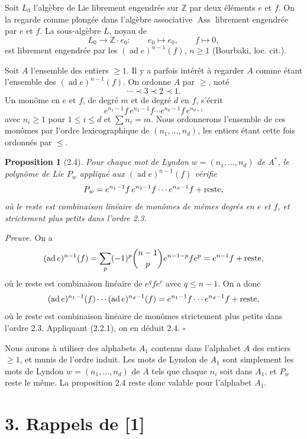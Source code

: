 \documentclass[10pt,a4paper]{article}
\newcommand{\Z}{\mathbb Z}
\newcommand{\Ass}{\operatorname{Ass}}
\newcommand{\ad}{\operatorname{ad}}
\theoremstyle{deligne}
\newtheorem*{proposition*}{Proposition}
\newenvironment{proofdel}{\textit{Preuve.}}{\hfill$\square$}
\newcommand{\heading}[1]{\vspace{0.65em}\noindent{\bfseries #1}\quad}
\begin{document}
\heading{2.3.} Soit \(L_0\) l'algèbre de Lie librement engendrée sur \(\Z\) par deux éléments \(e\) et \(f\). On la regarde comme plongée dans l'algèbre associative \(\Ass\) librement engendrée par \(e\) et \(f\). La sous-algèbre \(L\), noyau de
\[
\tag{2.3.1}
L_0\longrightarrow \Z\cdot e_0:\qquad e_0\longmapsto e_0,
\qquad f\longmapsto 0,
\]
est librement engendrée par les \((\ad e)^{n-1}(f)\), \(n\ge1\) (Bourbaki, loc. cit.).

Soit \(A\) l'ensemble des entiers \(\ge1\). Il y a parfois intérêt à regarder \(A\) comme étant l'ensemble des \((\ad e)^{n-1}(f)\). On ordonne \(A\) par \(\ge\), noté
\[
\cdots\prec 3\prec 2\prec 1.
\]
Un monôme en \(e\) et \(f\), de degré \(m\) et de degré \(d\) en \(f\), s'écrit
\[
e^{n_1-1}f\,e^{n_2-1}f\cdots e^{n_d-1}f\,e^{n_{d+1}}
\]
avec \(n_i\ge1\) pour \(1\le i\le d\) et \(\sum n_i=m\). Nous ordonnerons l'ensemble de ces monômes par l'ordre lexicographique de \((n_1,\ldots,n_d)\), les entiers étant cette fois ordonnés par \(\le\).

\begin{proposition*}[2.4]
Pour chaque mot de Lyndon \(w=(n_1,\ldots,n_d)\) de \(A^*\), le polynôme de Lie \(P_w\) appliqué aux \((\ad e)^{n-1}(f)\) vérifie
\[
P_w=e^{n_1-1}f\,e^{n_2-1}f\cdots e^{n_d-1}f+\hbox{reste},
\]
où le reste est combinaison linéaire de monômes de mêmes degrés en \(e\) et \(f\), et strictement plus petits dans l'ordre 2.3.
\end{proposition*}

\begin{proofdel}
On a
\[
(\ad e)^{n-1}(f)=\sum_p(-1)^p\binom{n-1}{p}e^{n-1-p}fe^p
=e^{n-1}f+\hbox{reste},
\]
où le reste est combinaison linéaire de \(e^qfe^r\) avec \(q\le n-1\). On a donc
\[
(\ad e)^{n_1-1}(f)\cdots(\ad e)^{n_d-1}(f)
=e^{n_1-1}f\cdots e^{n_d-1}f+\hbox{reste},
\]
où le reste est combinaison linéaire de monômes strictement plus petits dans l'ordre 2.3. Appliquant (2.2.1), on en déduit 2.4.
\end{proofdel}

\heading{2.5.} Nous aurons à utiliser des alphabets \(A_1\) contenus dans l'alphabet \(A\) des entiers \(\ge1\), et munis de l'ordre induit. Les mots de Lyndon de \(A_1\) sont simplement les mots de Lyndon \(w=(n_1,\ldots,n_d)\) de \(A\) tels que chaque \(n_i\) soit dans \(A_1\), et \(P_w\) reste le même. La proposition 2.4 reste donc valable pour l'alphabet \(A_1\).


\section*{3. Rappels de [1]}
\end{document}
